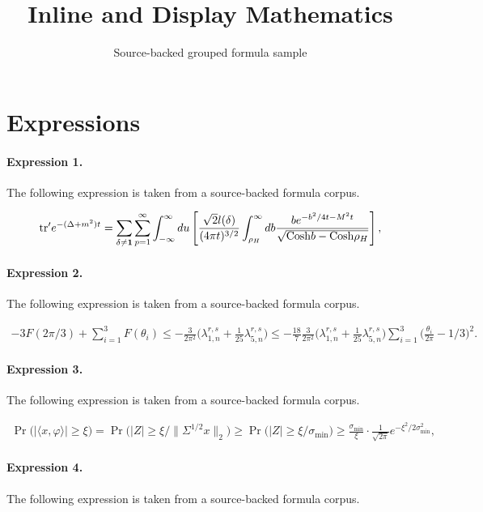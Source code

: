 \documentclass[11pt]{article}
\title{Inline and Display Mathematics}
\author{Source-backed grouped formula sample}
\date{}
\begin{document}
\maketitle
\section{Expressions}
\paragraph{Expression 1.} The following expression is taken from a source-backed formula corpus.

\begin{align*}{\rm tr}' e^{-(\Delta+m^2)t} = \sum_{\delta \neq {\bf 1}} \sum_{p=1}^{\infty} \int_{-\infty}^{\infty} du \left [ {{ {\sqrt{2}} l(\delta) }\over{(4\pi t)^{3/2}}} \int_{\rho_H}^\infty db {{ b e^{-b^2/4t - M^2 t} }\over{ {\sqrt{ {\rm Cosh} b - {\rm Cosh} \rho_H }} }} \right ] ,\end{align*}

\paragraph{Expression 2.} The following expression is taken from a source-backed formula corpus.

\begin{align*}-3F(2\pi/3)+\sum_{i=1}^{3}F(\theta_{i})\leq-\frac{3}{2\pi^{2}}\Big(\lambda_{1,n}^{r,s}+\frac{1}{25}\lambda_{5,n}^{r,s}\Big)\leq-\frac{18}{7}\frac{3}{2\pi^{2}}\Big(\lambda_{1,n}^{r,s}+\frac{1}{25}\lambda_{5,n}^{r,s}\Big)\sum_{i=1}^{3}\Big(\frac{\theta_{i}}{2\pi}-1/3\Big)^{2}.\end{align*}

\paragraph{Expression 3.} The following expression is taken from a source-backed formula corpus.

\begin{align*}\operatorname{Pr}\Big(|\langle x,\varphi\rangle|\geq\xi\Big)=\operatorname{Pr}\Big(|Z|\geq\xi/\|\Sigma^{1/2}x\|_2\Big)\geq\operatorname{Pr}\Big(|Z|\geq\xi/\sigma_\mathrm{min}\Big)\geq\frac{\sigma_\mathrm{min}}{\xi}\cdot\frac{1}{\sqrt{2\pi}}e^{-\xi^2/2\sigma_\mathrm{min}^2},\end{align*}

\paragraph{Expression 4.} The following expression is taken from a source-backed formula corpus.
\end{document}
